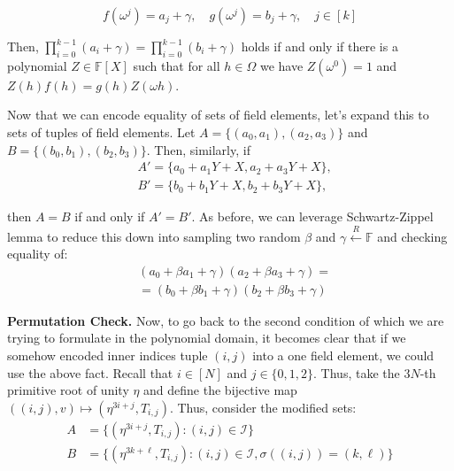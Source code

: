 \documentclass[../lecture-notes.tex]{subfiles}
\begin{document}
\begin{equation*}
    f(\omega^j) = a_j + \gamma, \quad g(\omega^j) = b_j + \gamma, \quad j \in [k]
\end{equation*}

Then, \(\prod_{i=0}^{k-1} (a_i + \gamma) = \prod_{i=0}^{k-1} (b_i + \gamma)\) holds if and only if there is a polynomial $Z \in \mathbb{F}[X]$ such that for all $h \in \Omega$ we have $Z(\omega^{0}) = 1$ and $Z(h)f(h) = g(h)Z(\omega h)$.

Now that we can encode equality of sets of field elements, let's expand this to sets of tuples of field elements. Let \(A = \{(a_0, a_1), (a_2, a_3)\}\) and \(B = \{(b_0, b_1), (b_2, b_3)\}\). Then, similarly, if
\begin{equation*}
    \begin{aligned}
        &A' = \{a_0 + a_1Y + X, a_2 + a_3Y + X\}, \\
        &B' = \{b_0 + b_1Y + X, b_2 + b_3Y + X\},
    \end{aligned}
\end{equation*}

then $A=B$ if and only if $A'=B'$. As before, we can leverage Schwartz-Zippel lemma to reduce this down into sampling two random $\beta$ and $\gamma \xleftarrow{R} \mathbb{F}$ and checking equality of:
\begin{equation*}
    \begin{aligned}
        &(a_0 + \beta a_1 + \gamma)(a_2 + \beta a_3 + \gamma) = \\ &= (b_0 + \beta b_1 + \gamma)(b_2 + \beta b_3 + \gamma)        
    \end{aligned}
\end{equation*}

\textbf{Permutation Check.} Now, to go back to the second condition of
 which we are trying to formulate in the polynomial
domain, it becomes clear that if we somehow encoded inner indices tuple $(i, j)$
into a one field element, we could use the above fact. Recall that $i \in [N]$
and $j \in \{0,1,2\}$. Thus, take the $3N$-th primitive root of unity $\eta$ and
define the bijective map $((i,j),v) \mapsto (\eta^{3i+j}, T_{i,j})$. Thus,
consider the modified sets:
\begin{align*}
    A &= \{(\eta^{3i+j}, T_{i,j}) : (i, j) \in \mathcal{I}\} \\
    B &= \{(\eta^{3k+\ell}, T_{i,j}) : (i, j) \in \mathcal{I}, \sigma((i, j)) = (k, \ell)\}
\end{align*}
\end{document}
